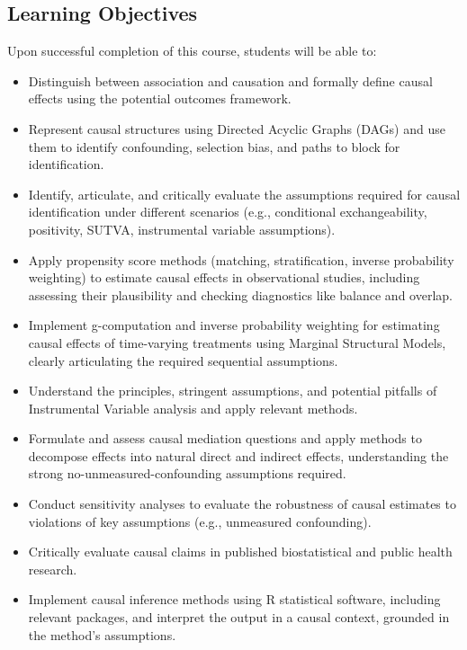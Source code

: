 \documentclass[10.5pt]{article}
\begin{document}
\subsection{Learning Objectives}
Upon successful completion of this course, students will be able to:
\begin{itemize}
    \item Distinguish between association and causation and formally define causal effects using the potential outcomes framework.
    \item Represent causal structures using Directed Acyclic Graphs (DAGs) and use them to identify confounding, selection bias, and paths to block for identification.
    \item Identify, articulate, and critically evaluate the assumptions required for causal identification under different scenarios (e.g., conditional exchangeability, positivity, SUTVA, instrumental variable assumptions).
    \item Apply propensity score methods (matching, stratification, inverse probability weighting) to estimate causal effects in observational studies, including assessing their plausibility and checking diagnostics like balance and overlap.
    \item Implement g-computation and inverse probability weighting for estimating causal effects of time-varying treatments using Marginal Structural Models, clearly articulating the required sequential assumptions.
    \item Understand the principles, stringent assumptions, and potential pitfalls of Instrumental Variable analysis and apply relevant methods.
    \item Formulate and assess causal mediation questions and apply methods to decompose effects into natural direct and indirect effects, understanding the strong no-unmeasured-confounding assumptions required.
    \item Conduct sensitivity analyses to evaluate the robustness of causal estimates to violations of key assumptions (e.g., unmeasured confounding).
    \item Critically evaluate causal claims in published biostatistical and public health research.
    \item Implement causal inference methods using R statistical software, including relevant packages, and interpret the output in a causal context, grounded in the method's assumptions.
\end{itemize}
\end{document}
